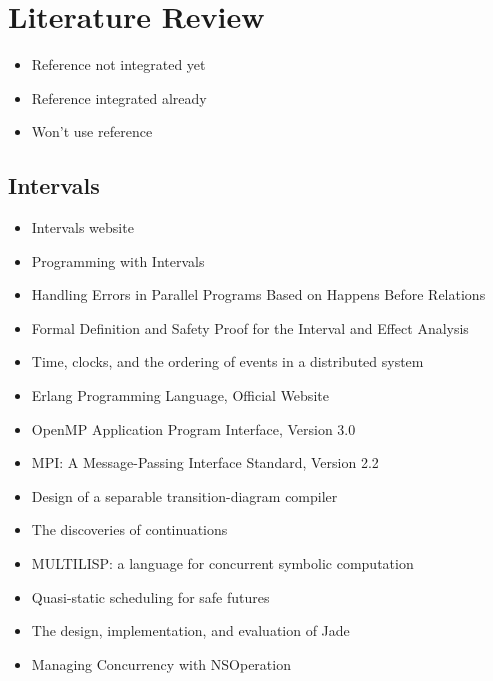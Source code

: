 
\chapter{Literature Review}
\label{cha:literature-review}

\begin{itemize}
\item Reference not integrated yet
\item[\checkmark] Reference integrated already
\item[\texttimes] Won't use reference
\end{itemize}


\section*{Intervals}
\label{sec:lr-intervals}

\begin{itemize}
\item[\checkmark] Intervals website \cite{Matsakis2010}
\item[\checkmark] Programming with Intervals \cite{Matsakis2009b}
\item[\checkmark] Handling Errors in Parallel Programs Based on
  Happens Before Relations \cite{Matsakis2010a}
\item[\checkmark] Formal Definition and Safety Proof for the Interval
  and Effect Analysis \cite{Matsakis2009}
\item[\checkmark] Time, clocks, and the ordering of events in a
  distributed system \cite{Lamport1978}
\item Erlang Programming Language, Official Website \cite{Erlang2010}
\item OpenMP Application Program Interface, Version 3.0
  \cite{OpenMP2008}
\item MPI: A Message-Passing Interface Standard, Version 2.2
  \cite{MPI2009}
\item Design of a separable transition-diagram compiler
  \cite{Conway1963}
\item The discoveries of continuations \cite{Reynolds1993}
\item MULTILISP: a language for concurrent symbolic computation
  \cite{Halstead1985}
\item Quasi-static scheduling for safe futures \cite{Navabi2008}
\item The design, implementation, and evaluation of Jade
  \cite{Rinard1998}
\item Managing Concurrency with NSOperation \cite{Apple2008}
\end{itemize}


